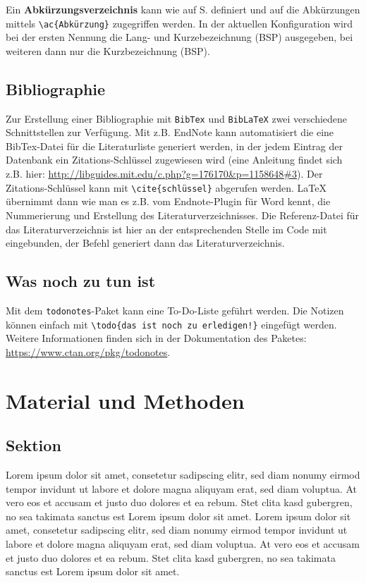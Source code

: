 \documentclass{scrreprt}
\begin{document}
Ein \textbf{Abkürzungsverzeichnis} kann wie auf S. \pageref{sec:abk_Verz} definiert und auf die Abkürzungen mittels \verb|\ac{Abkürzung}| zugegriffen werden. In der aktuellen Konfiguration wird bei der ersten Nennung die Lang- und Kurzebezeichnung (\ac{BSP}) ausgegeben, bei weiteren dann nur die Kurzbezeichnung (\ac{BSP}). 


\section{Bibliographie}

Zur Erstellung einer Bibliographie mit \verb|BibTex| und \verb|BibLaTeX| zwei verschiedene Schnittstellen zur Verfügung. Mit z.B. EndNote kann automatisiert die eine BibTex-Datei für die Literaturliste generiert werden, in der jedem Eintrag der Datenbank ein Zitations-Schlüssel zugewiesen wird (eine Anleitung findet sich z.B. hier: \url{http://libguides.mit.edu/c.php?g=176170&p=1158648#3}). Der Zitations-Schlüssel kann mit \verb|\cite{schlüssel}| abgerufen werden. LaTeX übernimmt dann wie man es z.B. vom Endnote-Plugin für Word kennt, die Nummerierung und Erstellung des Literaturverzeichnisses. 
Die Referenz-Datei für das Literaturverzeichnis ist hier an der entsprechenden Stelle im Code mit \\ \verb|| eingebunden, der Befehl  \verb|| generiert dann das Literaturverzeichnis. 

\section{Was noch zu tun ist}
Mit dem \verb|todonotes|-Paket kann eine To-Do-Liste geführt werden. Die Notizen können einfach mit \verb|\todo{das ist noch zu erledigen!}| eingefügt werden. Weitere Informationen finden sich in der Dokumentation des Paketes: \url{https://www.ctan.org/pkg/todonotes}.


\chapter{Material und Methoden}\label{sec:materialmethoden}

\section{Sektion}\label{sec:Sektion1}
Lorem ipsum dolor sit amet, consetetur sadipscing elitr, sed diam nonumy eirmod tempor invidunt ut labore et dolore magna aliquyam erat, sed diam voluptua. At vero eos et accusam et justo duo dolores et ea rebum. Stet clita kasd gubergren, no sea takimata sanctus est Lorem ipsum dolor sit amet. Lorem ipsum dolor sit amet, consetetur sadipscing elitr, sed diam nonumy eirmod tempor invidunt ut labore et dolore magna aliquyam erat, sed diam voluptua. At vero eos et accusam et justo duo dolores et ea rebum. Stet clita kasd gubergren, no sea takimata sanctus est Lorem ipsum dolor sit amet.
\end{document}
